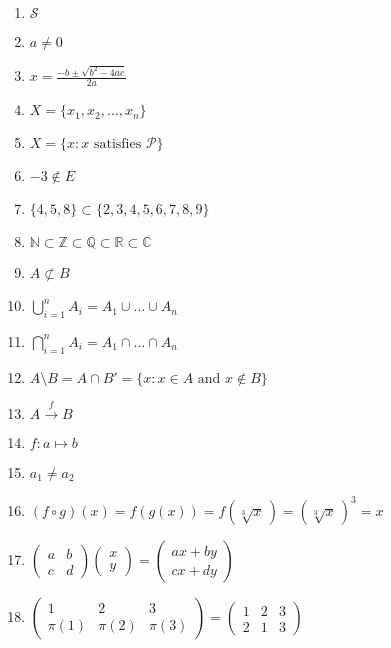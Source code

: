 \documentclass[oneside,10pt,]{article}
\title{}
\date{}
\newcommand{\notsubset}{\not\subset}
\begin{document}
\hypertarget{g:article:idp1}{}
%
\begin{enumerate}
\item{}\(\displaystyle \mathcal S\)%
\item{}\(\displaystyle a \neq 0\)%
\item{}\(\displaystyle x = \frac{-b \pm \sqrt{b^2 - 4ac}}{2a}\)%
\item{}\(\displaystyle X = \{ x_1, x_2, \ldots, x_n \}\)%
\item{}\(\displaystyle X = \{ x :x \text{ satisfies }{\mathcal P}\}\)%
\item{}\(\displaystyle -3 \notin E\)%
\item{}\(\displaystyle \{4,5,8\} \subset \{2, 3, 4, 5, 6, 7, 8, 9 \}\)%
\item{}\(\displaystyle {\mathbb N} \subset {\mathbb Z} \subset {\mathbb Q} \subset {\mathbb R} \subset {\mathbb C}\)%
\item{}\(\displaystyle A \notsubset B\)%
\item{}\(\displaystyle \bigcup_{i = 1}^{n} A_{i} = A_{1} \cup \ldots \cup A_n\)%
\item{}\(\displaystyle \bigcap_{i = 1}^{n} A_{i} = A_{1} \cap \ldots \cap A_n\)%
\item{}\(\displaystyle A \setminus B = A \cap B' = \{ x : x \in A \text{ and } x \notin B \}\)%
\item{}\(\displaystyle A \stackrel{f}{\rightarrow} B\)%
\item{}\(\displaystyle f : a \mapsto b\)%
\item{}\(\displaystyle a_1 \neq a_2\)%
\item{}\(\displaystyle (f \circ g )(x) = f(g(x)) = f( \sqrt[3]{x}\, ) = (\sqrt[3]{x}\, )^3 = x\)%
\item{}\(\displaystyle \begin{pmatrix} a & b \\ c & d \end{pmatrix} \begin{pmatrix} x \\ y \end{pmatrix} = \begin{pmatrix} ax + by \\ cx +dy \end{pmatrix}\)%
\item{}\(\displaystyle \begin{pmatrix} 1 & 2 & 3 \\ \pi(1) & \pi(2) & \pi(3) \end{pmatrix} = \begin{pmatrix} 1 & 2 & 3 \\ 2 & 1 & 3 \end{pmatrix}\)%

\end{enumerate}
\end{document}
